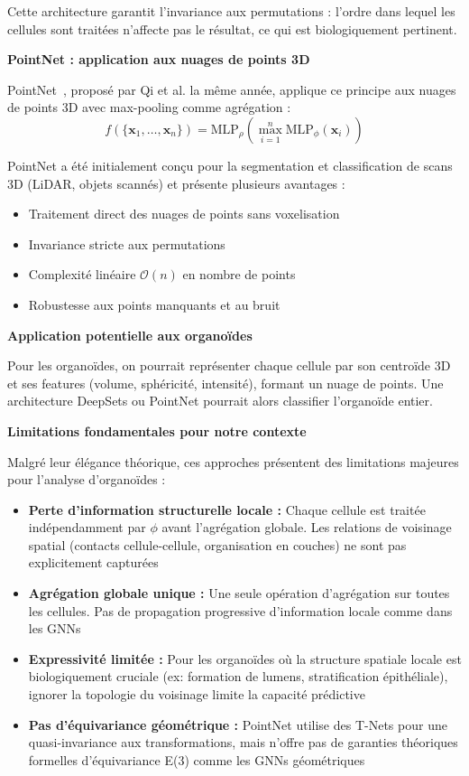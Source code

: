 Cette architecture garantit l'invariance aux permutations : l'ordre dans lequel les cellules sont traitées n'affecte pas le résultat, ce qui est biologiquement pertinent.

\textbf{PointNet : application aux nuages de points 3D}

PointNet~\cite{Qi2017}, proposé par Qi et al. la même année, applique ce principe aux nuages de points 3D avec max-pooling comme agrégation :
\[
f(\{\mathbf{x}_1, \ldots, \mathbf{x}_n\}) = \text{MLP}_{\rho}\left(\max_{i=1}^n \text{MLP}_{\phi}(\mathbf{x}_i)\right)
\]

PointNet a été initialement conçu pour la segmentation et classification de scans 3D (LiDAR, objets scannés) et présente plusieurs avantages :
\begin{itemize}
    \item Traitement direct des nuages de points sans voxelisation
    \item Invariance stricte aux permutations
    \item Complexité linéaire $\mathcal{O}(n)$ en nombre de points
    \item Robustesse aux points manquants et au bruit
\end{itemize}

\textbf{Application potentielle aux organoïdes}

Pour les organoïdes, on pourrait représenter chaque cellule par son centroïde 3D et ses features (volume, sphéricité, intensité), formant un nuage de points. Une architecture DeepSets ou PointNet pourrait alors classifier l'organoïde entier.

\textbf{Limitations fondamentales pour notre contexte}

Malgré leur élégance théorique, ces approches présentent des limitations majeures pour l'analyse d'organoïdes :
\begin{itemize}
    \item \textbf{Perte d'information structurelle locale :} Chaque cellule est traitée indépendamment par $\phi$ avant l'agrégation globale. Les relations de voisinage spatial (contacts cellule-cellule, organisation en couches) ne sont pas explicitement capturées
    \item \textbf{Agrégation globale unique :} Une seule opération d'agrégation sur toutes les cellules. Pas de propagation progressive d'information locale comme dans les GNNs
    \item \textbf{Expressivité limitée :} Pour les organoïdes où la structure spatiale locale est biologiquement cruciale (ex: formation de lumens, stratification épithéliale), ignorer la topologie du voisinage limite la capacité prédictive
    \item \textbf{Pas d'équivariance géométrique :} PointNet utilise des T-Nets pour une quasi-invariance aux transformations, mais n'offre pas de garanties théoriques formelles d'équivariance E(3) comme les GNNs géométriques
\end{itemize}

